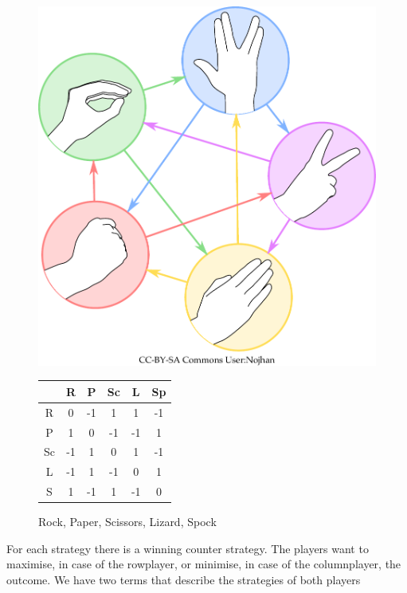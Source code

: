 \begin{figure}[hbt]
\begin{minipage}[hbt]{0.4\linewidth}
\href{http://en.wikipedia.org/wiki/File:Pierre_ciseaux_feuille_l\%C3\%A9zard_spock.svg}{\includegraphics[width=\linewidth]{./images/rpsclsp.pdf}}
\end{minipage}
\hfill
\begin{minipage}[hbt]{0.4\linewidth}
\begin{center}
\begin{tabular}{c|ccccc}
 & R & P & Sc & L & Sp \\\hline
R & 0 & -1 & 1 & 1 & -1\\
P & 1 & 0 & -1 & -1 & 1\\
Sc & -1 & 1 & 0 & 1 & -1\\
L & -1 & 1 & -1 & 0 & 1\\
S & 1 & -1 & 1 & -1 & 0\\
\end{tabular}
\end{center}
\end{minipage}
\caption{Rock, Paper, Scissors, Lizard, Spock}
\label{Fig:rpsclsp}
\end{figure}


For each strategy there is a winning counter strategy. The players want to maximise, in case of the rowplayer, or minimise, in case of the columnplayer, the outcome. We have two terms that describe the strategies of both players

